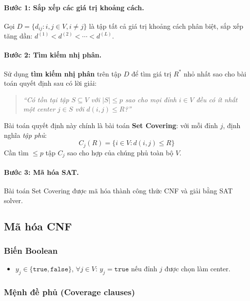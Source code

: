 \documentclass[11pt,a4paper]{article}
\begin{document}
\paragraph{Bước 1: Sắp xếp các giá trị khoảng cách.}
Gọi $D = \{d_{ij} : i, j \in V, i \ne j\}$ là tập tất cả giá trị khoảng cách phân biệt, sắp xếp tăng dần: $d^{(1)} < d^{(2)} < \cdots < d^{(L)}$.

\paragraph{Bước 2: Tìm kiếm nhị phân.}
Sử dụng \textbf{tìm kiếm nhị phân} trên tập $D$ để tìm giá trị $R^*$ nhỏ nhất sao cho bài toán quyết định sau có lời giải:

\begin{quote}
\emph{``Có tồn tại tập $S \subseteq V$ với $|S| \le p$ sao cho mọi đỉnh $i \in V$ đều có ít nhất một center $j \in S$ với $d(i,j) \le R$?''}
\end{quote}

Bài toán quyết định này chính là bài toán \textbf{Set Covering}:
với mỗi đỉnh $j$, định nghĩa \emph{tập phủ}:
\[
    C_j(R) = \{i \in V : d(i,j) \le R\}
\]
Cần tìm $\le p$ tập $C_j$ sao cho hợp của chúng phủ toàn bộ $V$.

\paragraph{Bước 3: Mã hóa SAT.}
Bài toán Set Covering được mã hóa thành công thức CNF và giải bằng SAT solver.

\subsection{Mã hóa CNF}

\subsubsection{Biến Boolean}
\begin{itemize}[nosep]
    \item $y_j \in \{\texttt{true}, \texttt{false}\}$, $\forall j \in V$: $y_j = \texttt{true}$ nếu đỉnh $j$ được chọn làm center.
\end{itemize}

\subsubsection{Mệnh đề phủ (Coverage clauses)}
\end{document}
